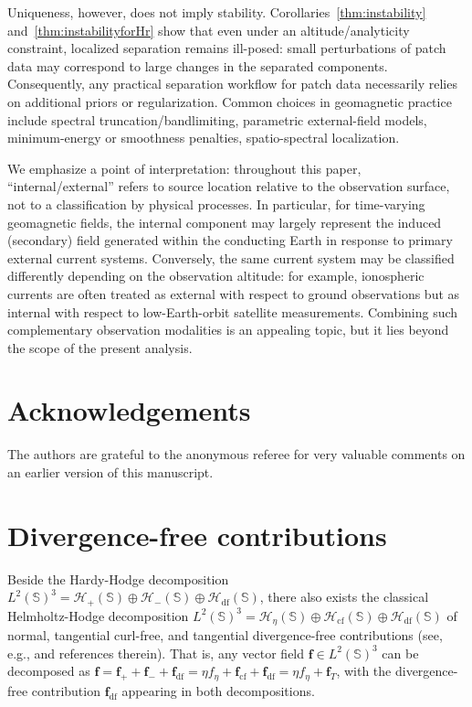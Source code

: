 \documentclass[a4paper, 11pt]{article}
\renewcommand{\SS}{\mathbb{S}}
\newcommand{\f}{\mathbf{f}}
\begin{document}
Uniqueness, however, does not imply stability. Corollaries~\ref{thm:instability} and~\ref{thm:instabilityforHr} show that even under an altitude/analyticity constraint, localized separation remains ill-posed: small perturbations of patch data may correspond to large changes in the separated components. Consequently, any practical separation workflow for patch data necessarily relies on additional priors or regularization. Common choices in geomagnetic practice include spectral truncation/bandlimiting, parametric external-field models, minimum-energy or smoothness penalties, spatio-spectral localization. 

We emphasize a point of interpretation: throughout this paper, “internal/external” refers to source location relative to the observation surface, not to a classification by physical processes. In particular, for time-varying geomagnetic fields, the internal component may largely represent the induced (secondary) field generated within the conducting Earth in response to primary external current systems. Conversely, the same current system may be classified differently depending on the observation altitude: for example, ionospheric currents are often treated as external with respect to ground observations but as internal with respect to low-Earth-orbit satellite measurements. Combining such complementary observation modalities is an appealing topic, but it lies beyond the scope of the present analysis.

\section*{Acknowledgements}
The authors are grateful to the anonymous referee for very valuable comments on an earlier version of this manuscript.

\small



\normalsize
\appendix

\section{Divergence-free contributions}\label{app:divfree}

Beside the Hardy-Hodge decomposition $L^2(\SS)^3=\mathcal H_+(\SS)\oplus \mathcal H_-(\SS)\oplus \mathcal H_{\mathrm{df}}(\SS)$, there also exists the classical Helmholtz-Hodge decomposition $L^2(\SS)^3=\mathcal H_\eta(\SS)\oplus \mathcal H_{\mathrm{cf}}(\SS)\oplus \mathcal H_{\mathrm{df}}(\SS)$ of normal, tangential curl-free, and tangential divergence-free contributions (see, e.g., \cite{freedengerhards12,gerhards18a} and references therein). That is, any vector field $\f\in L^2(\SS)^3$ can be decomposed as $\f=\f_++\f_-+\f_{\mathrm{df}}=\eta f_\eta+\f_{\mathrm{cf}}+\f_{\mathrm{df}}=\eta f_\eta+\f_T$, with the divergence-free contribution $\f_{\mathrm{df}}$ appearing in both decompositions.
\end{document}
